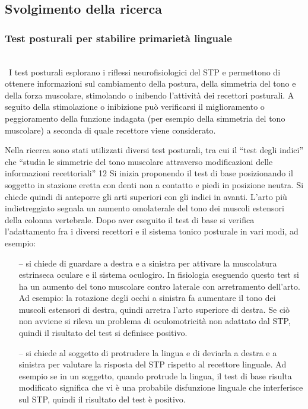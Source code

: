 \subsection{Svolgimento della ricerca}

\subsubsection{Test posturali per stabilire primarietà linguale}
\\\
I test posturali esplorano i riflessi neurofisiologici del STP e permettono di ottenere informazioni sul cambiamento
della postura, della simmetria del tono e della forza muscolare, stimolando o inibendo l’attività dei recettori posturali.
A seguito della stimolazione o inibizione può verificarsi il miglioramento o peggioramento della funzione indagata (per
esempio della simmetria del tono muscolare) a seconda di quale recettore viene considerato.

Nella ricerca sono stati utilizzati diversi test posturali, tra cui il “test degli indici” che “studia le simmetrie del tono
muscolare attraverso modificazioni delle informazioni recettoriali” 12 Si inizia proponendo il test di base posizionando il
soggetto in stazione eretta con denti non a contatto e piedi in posizione neutra. Si chiede quindi di anteporre gli arti
superiori con gli indici in avanti. L’arto più indietreggiato segnala un aumento omolaterale del tono dei muscoli
estensori della colonna vertebrale. Dopo aver eseguito il test di base si verifica l’adattamento fra i diversi recettori e il
sistema tonico posturale in vari modi, ad esempio:
\begin{itemize}
 \itemsep-0.5em
 \item[--]si chiede di guardare a destra e a sinistra per attivare la muscolatura estrinseca oculare e il sistema oculogiro. In
fisiologia eseguendo questo test si ha un aumento del tono muscolare contro laterale con arretramento dell’arto. Ad
esempio: la rotazione degli occhi a sinistra fa aumentare il tono dei muscoli estensori di destra, quindi arretra l’arto
superiore di destra. Se ciò non avviene si rileva un problema di oculomotricità non adattato dal STP, quindi il risultato
del test si definisce positivo.
 \item[--]si chiede al soggetto di protrudere la lingua e di deviarla a destra e a sinistra per valutare la risposta del STP rispetto al
recettore linguale. Ad esempio se in un soggetto, quando protrude la lingua, il test di base risulta modificato significa
che vi è una probabile disfunzione linguale che interferisce sul STP, quindi il risultato del test è positivo.
\end{itemize}

